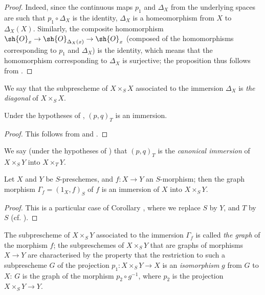 \begin{proof}
Indeed, since the continuous maps $p_1$ and $\Delta_X$ from the underlying spaces are such that $p_1\circ\Delta_X$ is the identity, $\Delta_X$ is a homeomorphism from $X$ to $\Delta_X(X)$.
Similarly, the composite homomorphism $\sh{O}_x\to\sh{O}_{\Delta_X(x)}\to\sh{O}_x$ (composed of the homomorphisms corresponding to $p_1$ and $\Delta_X$) is the identity, which means that the homomorphism corresponding to $\Delta_X$ is surjective;
the proposition thus follows from .
\end{proof}

We say that the subprescheme of $X\times_S X$ associated to the immersion $\Delta_X$  is \emph{the diagonal} of $X\times_S X$.

\begin{corollary}[5.3.10]
\label{I.5.3.10}
Under the hypotheses of , $(p,q)_T$ is an immersion.
\end{corollary}

\begin{proof}
This follows from  and .
\end{proof}

We say (under the hypotheses of ) that $(p,q)_T$ is the \emph{canonical immersion} of $X\times_S Y$ into $X\times_T Y$.

\begin{corollary}[5.3.11]
\label{I.5.3.11}
Let $X$ and $Y$ be $S$-preschemes, and $f:X\to Y$ an $S$-morphism;
then the graph morphism $\Gamma_f=(1_X,f)_S$ of $f$  is an immersion of $X$ into $X\times_S Y$.
\end{corollary}

\begin{proof}
This is a particular case of Corollary , where we replace $S$ by $Y$, and $T$ by $S$ (cf. ).
\end{proof}

The subprescheme of $X\times_S Y$ associated to the immersion $\Gamma_f$  is called \emph{the graph} of the morphism $f$;
the subpreschemes of $X\times_S Y$ that are graphs of morphisms $X\to Y$ are characterised by the property that the restriction to such a subprescheme $G$ of the projection $p_1:X\times_S Y\to X$ is an \emph{isomorphism} $g$ from $G$ to $X$:
$G$ is the graph of the morphism $p_2\circ g^{-1}$, where $p_2$ is the projection $X\times_S Y\to Y$.

